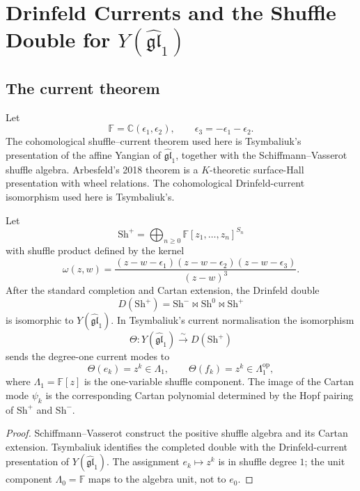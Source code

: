 \section{Drinfeld Currents and the Shuffle Double for
\texorpdfstring{$Y(\widehat{\mathfrak{gl}}_1)$}{Y(gl1hat)}}
\label{sec:drinfeld-currents-shuffle-double}

\providecommand{\kch}{\kappa_{\mathrm{ch}}}
\providecommand{\gghone}{\widehat{\mathfrak{gl}}_1}
\providecommand{\Yplus}{Y^+_{\epsilon_1,\epsilon_2,\epsilon_3}}
\providecommand{\Sh}{\mathrm{Sh}}
\providecommand{\CoHA}{\mathrm{CoHA}}
\providecommand{\Lam}{\Lambda}

\subsection{The current theorem}

Let
\[
  \mathbb F=\mathbb C(\epsilon_1,\epsilon_2),\qquad
  \epsilon_3=-\epsilon_1-\epsilon_2 .
\]
The cohomological shuffle--current theorem used here is Tsymbaliuk's
presentation of the affine Yangian of \(\gghone\), together with the
Schiffmann--Vasserot shuffle algebra.  Arbesfeld's 2018 theorem is a
\(K\)-theoretic surface-Hall presentation with wheel relations.  The
cohomological Drinfeld-current isomorphism used here is Tsymbaliuk's.

\begin{theorem}
\label{thm:drinfeld-current-shuffle-double}
Let
\[
  \Sh^+=\bigoplus_{n\geq0}\mathbb F[z_1,\ldots,z_n]^{S_n}
\]
with shuffle product defined by the kernel
\[
  \omega(z,w)
  =
  \frac{(z-w-\epsilon_1)(z-w-\epsilon_2)(z-w-\epsilon_3)}
       {(z-w)^3}.
\]
After the standard completion and Cartan extension, the Drinfeld
double
\[
  D(\Sh^+)=\Sh^-\bowtie\Sh^0\bowtie\Sh^+
\]
is isomorphic to \(Y(\gghone)\).  In Tsymbaliuk's current
normalisation the isomorphism
\[
  \Theta:Y(\gghone)\xrightarrow{\sim}D(\Sh^+)
\]
sends the degree-one current modes to
\[
  \Theta(e_k)=z^k\in\Lam_1,\qquad
  \Theta(f_k)=z^k\in\Lam_1^{\mathrm{op}},
\]
where \(\Lam_1=\mathbb F[z]\) is the one-variable shuffle component.
The image of the Cartan mode \(\psi_k\) is the corresponding Cartan
polynomial determined by the Hopf pairing of \(\Sh^+\) and
\(\Sh^-\).
\end{theorem}

\begin{proof}
Schiffmann--Vasserot construct the positive shuffle algebra and its
Cartan extension.  Tsymbaliuk identifies the completed double with the
Drinfeld-current presentation of \(Y(\gghone)\).  The assignment
\(e_k\mapsto z^k\) is in shuffle degree \(1\); the unit component
\(\Lam_0=\mathbb F\) maps to the algebra unit, not to \(e_0\).
\end{proof}

